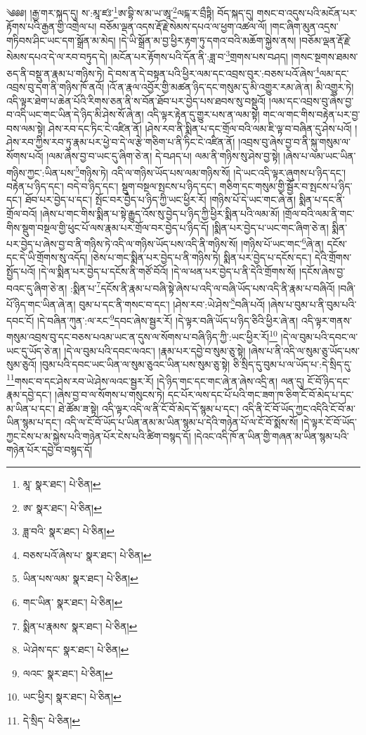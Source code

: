 \setcounter{footnote}{0} 
༄༅༅། །རྒྱ་གར་སྐད་དུ། ས་:མཱ་ཛཿ་\footnote{མཱ་  སྣར་ཐང་།  པེ་ཅིན། }ཨ་བྷི་ས་མ་ཡ་ཨཱ་\footnote{ཨ་  སྣར་ཐང་།  པེ་ཅིན། }ལངྐ་ར་བྲྀཏྟི། བོད་སྐད་དུ། གསང་བ་འདུས་པའི་མངོན་པར་རྟོགས་པའི་རྒྱན་གྱི་འགྲེལ་པ། བཅོམ་ལྡན་འདས་རྡོ་རྗེ་སེམས་དཔའ་ལ་ཕྱག་འཚལ་ལོ། །གང་ཞིག་མུན་འདྲས་གཏིབས་ཤིང་ཡང་དག་སྒྲོན་མ་མེད། །དེ་ཡི་སྒྲོན་མ་བྱ་ཕྱིར་རྟག་ཏུ་དགའ་བའི་མཆོག་སྐྱེས་ནས། །བཅོམ་ལྡན་རྡོ་རྗེ་སེམས་དཔའ་དེ་ལ་རབ་བཏུད་དེ། །མངོན་པར་རྟོགས་པའི་དོན་ནི་:ཟླ་བ་\footnote{ཟླ་བའི་  སྣར་ཐང་།  པེ་ཅིན། }གྲགས་པས་བཤད། །གསང་སྔགས་ཐམས་ཅད་ནི་བསྡུ་ན་རྣམ་པ་གཉིས་ཏེ། དེ་བས་ན་དེ་བསྟན་པའི་ཕྱིར་ལམ་དང་འབྲས་བུར་:བཅས་པའོ་ཞེས་\footnote{བཅས་པའོ་ཞེས་པ་  སྣར་ཐང་།  པེ་ཅིན། }ལམ་དང་འབྲས་བུ་དག་ནི་གཉིས་ཁོ་ནའོ། །འོ་ན་རྣལ་འབྱོར་གྱི་མཚན་ཉིད་དང་གསུམ་དུ་མི་འགྱུར་རམ་ཞེ་ན། མི་འགྱུར་ཏེ། འདི་ལྟར་ཐེག་པ་ཆེན་པོའི་རིགས་ཅན་ནི་ས་བོན་ཐོབ་པར་བྱེད་པས་ཐབས་སུ་བསྡུའོ། །ལམ་དང་འབྲས་བུ་ཞེས་བྱ་བ་འདི་ཡང་གང་ཡིན་དེ་ཉིད་མི་ཤེས་སོ་ཞེ་ན། འདི་ལྟར་རྟེན་དུ་གྱུར་པས་ན་ལམ་སྟེ། གང་ལ་གང་གིས་བརྟེན་པར་བྱ་བས་ལམ་སྟེ། ཤེས་རབ་དང་ཏིང་ངེ་འཛིན་ནོ། །ཤེས་རབ་ནི་སྨིན་པ་དང་གྲོལ་བའི་ལམ་ཇི་ལྟ་བ་བཞིན་དུ་ཤེས་པའོ། །ཤེས་རབ་ཀྱིས་རབ་ཏུ་རྣམ་པར་ཕྱེ་བ་དེ་ལ་རྩེ་གཅིག་པ་ནི་ཏིང་ངེ་འཛིན་ནོ། །འབྲས་བུ་ཞེས་བྱ་བ་ནི་སྐུ་གསུམ་ལ་སོགས་པའོ། །ལམ་ཞེས་བྱ་བ་ཡང་དུ་ཞིག་ཅེ་ན། དེ་བཤད་པ། ལམ་ནི་གཉིས་སུ་ཤེས་བྱ་སྟེ། །ཞེས་པ་ལམ་ཡང་ཡིན་གཉིས་ཀྱང་:ཡིན་པས་\footnote{ཡིན་པས་ལམ་  སྣར་ཐང་།  པེ་ཅིན། }གཉིས་ཏེ། འདི་ལ་གཉིས་ཡོད་པས་ལམ་གཉིས་སོ། །དེ་ཡང་འདི་ལྟར་ཞུགས་པ་ཉིད་དང་། བརྟེན་པ་ཉིད་དང་། བདེ་བ་ཉིད་དང་། སྡུག་བསྔལ་སྤངས་པ་ཉིད་དང་། གཅིག་དང་གསུམ་གྱི་སྦྱོར་བ་སྤངས་པ་ཉིད་དང་། ཐོབ་པར་བྱེད་པ་དང་། སྤོང་བར་བྱེད་པ་ཉིད་ཀྱི་ཡང་ཕྱིར་རོ། །གཉིས་པོ་དེ་ཡང་གང་ཞེ་ན། སྨིན་པ་དང་ནི་གྲོལ་བའོ། །ཞེས་པ་གང་གིས་སྨིན་པ་སྟེ་རྒྱུད་འོས་སུ་བྱེད་པ་ཉིད་ཀྱི་ཕྱིར་སྨིན་པའི་ལམ་མོ། །གྲོལ་བའི་ལམ་ནི་གང་གིས་སྡུག་བསྔལ་གྱི་ཕུང་པོ་ལས་རྣམ་པར་གྲོལ་བར་བྱེད་པ་ཉིད་དོ། །སྨིན་པར་བྱེད་པ་ཡང་གང་ཞིག་ཅེ་ན། སྨིན་པར་བྱེད་པ་ཞེས་བྱ་བ་ནི་གཉིས་ཏེ་འདི་ལ་གཉིས་ཡོད་པས་འདི་ནི་གཉིས་སོ། །གཉིས་པོ་ཡང་གང་\footnote{གང་ཡིན་  སྣར་ཐང་།  པེ་ཅིན། }ཞེ་ན། དངོས་དང་དེ་ཡི་གྲོགས་སུ་འདོད། །ཅེས་པ་གང་སྨིན་པར་བྱེད་པ་ནི་གཉིས་ཏེ། སྨིན་པར་བྱེད་པ་དངོས་དང་། དེའི་གྲོགས་སྤྱོད་པའོ། །དེ་ལ་སྨིན་པར་བྱེད་པ་དངོས་ནི་གཙོ་བོའོ། །དེ་ལ་ཕན་པར་བྱེད་པ་ནི་དེའི་གྲོགས་སོ། །དངོས་ཞེས་བྱ་བའང་དུ་ཞིག་ཅེ་ན། :སྨིན་པ་\footnote{སྨིན་པ་རྣམས་  སྣར་ཐང་།  པེ་ཅིན། }དངོས་ནི་རྣམ་པ་བཞི་སྟེ་ཞེས་པ་འདི་ལ་བཞི་ཡོད་པས་འདི་ནི་རྣམ་པ་བཞིའོ། །བཞི་པོ་ཉིད་གང་ཡིན་ཞེ་ན། བུམ་པ་དང་ནི་གསང་བ་དང་། །ཤེས་རབ་:ཡེ་ཤེས་\footnote{ཡེ་ཤེས་དང་  སྣར་ཐང་།  པེ་ཅིན། }བཞི་པའོ། །ཞེས་པ་བུམ་པ་ནི་བུམ་པའི་དབང་ངོ། །དེ་བཞིན་ཀུན་:ལ་རང་\footnote{ལའང་  སྣར་ཐང་།  པེ་ཅིན། }དབང་ཞེས་སྦྱར་རོ། །དེ་ལྟར་བཞི་ཡོད་པ་ཉིད་ཅིའི་ཕྱིར་ཞེ་ན། འདི་ལྟར་གནས་གསུམ་འབྲས་བུ་དང་བཅས་པའམ་ཡང་ན་དུས་ལ་སོགས་པ་བཞི་ཉིད་ཀྱི་:ཡང་ཕྱིར་རོ།\footnote{ཡང་ཕྱིར།  སྣར་ཐང་།  པེ་ཅིན། } །དེ་ལ་བུམ་པའི་དབང་ལ་ཡང་དུ་ཡོད་ཅེ་ན། །དེ་ལ་བུམ་པའི་དབང་ལའང་། །རྣམ་པར་དབྱེ་བ་སུམ་ཅུ་སྟེ། །ཞེས་པ་ནི་འདི་ལ་སུམ་ཅུ་ཡོད་པས་སུམ་ཅུའོ། །བུམ་པའི་དབང་ཡང་ཡིན་ལ་སུམ་ཅུའང་ཡིན་པས་སུམ་ཅུ་སྟེ། ཅི་སྲིད་དུ་བུམ་པ་ལ་ཡོད་པ་:དེ་སྲིད་དུ་\footnote{དེ་སྲིད་  པེ་ཅིན། }གསང་བ་དང་ཤེས་རབ་ཡེ་ཤེས་ལའང་སྦྱར་རོ། །དེ་ཉིད་གང་དང་གང་ཞེ་ན་ཞེས་འདྲི་ན། ལན་དུ། ངོ་བོ་ཉིད་དང་རྣམ་དབྱེ་དང་། །ཞེས་བྱ་བ་ལ་སོགས་པ་གསུངས་ཏེ། དང་པོར་ལས་དང་པོ་པའི་གང་ཟག་ཁ་ཅིག་ངོ་བོ་མེད་པ་དང་མ་ཡིན་པ་དང་། ཐེ་ཚོམ་ཟ་སྟེ། འདི་ལྟར་འདི་ལ་ནི་ངོ་བོ་མེད་དོ་སྙམ་པ་དང་། འདི་ནི་ངོ་བོ་ཡོད་ཀྱང་འདིའི་ངོ་བོ་མ་ཡིན་སྙམ་པ་དང་། འདི་ལ་ངོ་བོ་ཡོད་པ་ཡིན་ནམ་མ་ཡིན་སྙམ་པ་དེའི་གཉེན་པོ་ལ་ངོ་བོ་སྨོས་སོ། །དེ་ལྟར་ངོ་བོ་ཡོད་ཀྱང་ངེས་པ་མ་སྐྱེས་པའི་གཉེན་པོར་ངེས་པའི་ཚིག་བསྙད་དོ། །དེའང་འདི་ཁོ་ན་ཡིན་གྱི་གཞན་མ་ཡིན་སྙམ་པའི་གཉེན་པོར་དབྱེ་བ་བསྙད་དོ། 